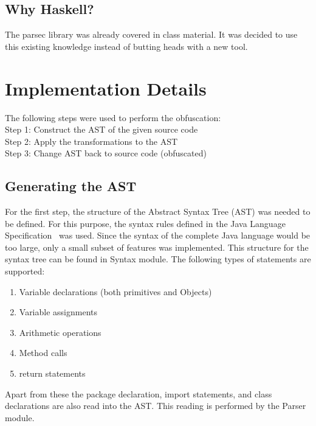 \documentclass{article}
\begin{document}
\subsection{Why Haskell?} 
The parsec library was already covered in class material. It was decided to use this existing knowledge instead of butting heads with a new tool.

\section{Implementation Details}
The following steps were used to perform the obfuscation: \\
Step 1: Construct the AST of the given source code\\
Step 2: Apply the transformations to the AST\\
Step 3: Change AST back to source code (obfuscated)\\


\subsection{Generating the AST}
For the first step, the structure of the Abstract Syntax Tree (AST) was needed to be defined. For this purpose, the syntax rules defined in the Java Language Specification~\cite{java_specs} was used. Since the syntax of the complete Java language would be too large, only a small subset of features
was implemented. This structure for the syntax tree can be found in Syntax module. The following types of statements are supported:
\begin{enumerate}
\item Variable declarations (both primitives and Objects)
\item Variable assignments
\item Arithmetic operations
\item Method calls
\item return statements
\end{enumerate}
Apart from these the package declaration, import statements, and class declarations are also read into the AST. This reading is performed by
the Parser module.
\end{document}
